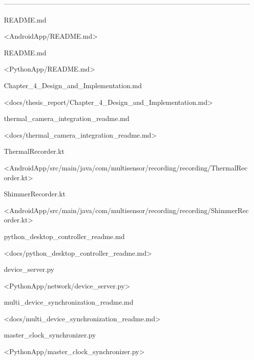 ------------------------------------------------------------------------------------------------------------

\cite{ref1}
\cite{ref4}
\cite{ref5}
\cite{ref6}
\cite{ref13}
\cite{ref14}
\cite{ref53}
\cite{ref55}
\cite{ref57}
README.md

<AndroidApp/README.md>

\cite{ref2}
\cite{ref27}
\cite{ref28}
\cite{ref29}
\cite{ref31}
\cite{ref32}
\cite{ref33}
README.md

<PythonApp/README.md>

\cite{ref3}
\cite{ref52}
Chapter_4_Design_and_Implementation.md

<docs/thesis_report/Chapter_4_Design_and_Implementation.md>

\cite{ref7}
\cite{ref8}
\cite{ref9}
thermal_camera_integration_readme.md

<docs/thermal_camera_integration_readme.md>

\cite{ref10}
\cite{ref11}
\cite{ref12}
ThermalRecorder.kt

<AndroidApp/src/main/java/com/multisensor/recording/recording/ThermalRecorder.kt>

\cite{ref15}
\cite{ref16}
\cite{ref17}
\cite{ref18}
\cite{ref19}
\cite{ref20}
\cite{ref21}
\cite{ref22}
\cite{ref23}
\cite{ref24}
\cite{ref25}
\cite{ref26}
ShimmerRecorder.kt

<AndroidApp/src/main/java/com/multisensor/recording/recording/ShimmerRecorder.kt>

\cite{ref30}
\cite{ref54}
python_desktop_controller_readme.md

<docs/python_desktop_controller_readme.md>

\cite{ref34}
\cite{ref35}
\cite{ref36}
\cite{ref37}
\cite{ref38}
\cite{ref39}
\cite{ref40}
\cite{ref41}
\cite{ref51}
device_server.py

<PythonApp/network/device_server.py>

\cite{ref42}
\cite{ref43}
\cite{ref48}
\cite{ref49}
\cite{ref50}
\cite{ref56}
multi_device_synchronization_readme.md

<docs/multi_device_synchronization_readme.md>

\cite{ref44}
\cite{ref45}
\cite{ref46}
\cite{ref47}
master_clock_synchronizer.py

<PythonApp/master_clock_synchronizer.py>

